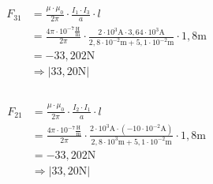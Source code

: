 \begin{enumerate}
        \begin{align*}
          F_{31} & =\frac{\mu\cdot\mu_{0}}{2\pi}\cdot\frac{I_{1}\cdot I_{3}}{a}\cdot l                                                                                                                        \\
                 & =\frac{4\pi\cdot 10^{-7}\frac{\text{H}}{\text{m}}}{2\pi}\cdot\frac{2\cdot 10^{3}\text{A}\cdot 3,64\cdot 10^{3}\text{A}}{2,8\cdot 10^{-2}\text{m}+5,1\cdot 10^{-2}\text{m}}\cdot 1,8\text{m} \\
                 & =-33,202\text{N}                                                                                                                                                                           \\
                 & \Rightarrow |33,20\text{N}|                                                                                                                                                                \\                                                                                                                                                                 \\
        \end{align*}

        \begin{align*}
          F_{21} & =\frac{\mu\cdot\mu_{0}}{2\pi}\cdot\frac{I_{2}\cdot I_{1}}{a}\cdot l                                                                                                                         \\
                 & =\frac{4\pi\cdot 10^{-7}\frac{\text{H}}{\text{m}}}{2\pi}\cdot\frac{2\cdot 10^{3}\text{A}\cdot(-10\cdot 10^{-2}\text{A})}{2,8\cdot 10^{3}\text{m}+5,1\cdot 10^{-2}\text{m}}\cdot 1,8\text{m} \\
                 & =-33,202\text{N}                                                                                                                                                                            \\
                 & \Rightarrow |33,20\text{N}|                                                                                                                                                                 \\                                                                                                                                                              \\
        \end{align*}

\end{enumerate}
